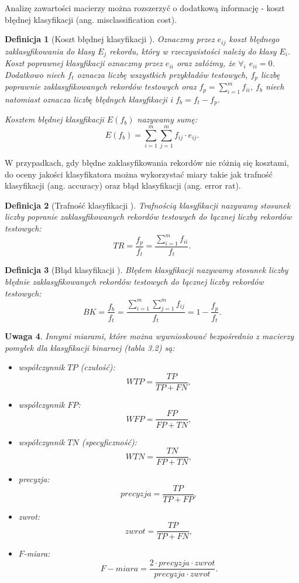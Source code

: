 \documentclass[12pt,a4paper]{report}
\newtheorem{df}{Definicja}[chapter]
\newtheorem{uwaga}[df]{Uwaga}
\begin{document}
Analizę zawartości macierzy można rozszerzyć o dodatkową informację - koszt błędnej klasyfikacji (ang. misclassification cost).
\begin{df}[Koszt błędnej klasyfikacji {\citep[Sec 4.8.1]{edmia}}]
Oznaczmy przez $e_{ij}$ koszt błędnego zaklasyfikowania do klasy $E_j$ rekordu, który w rzeczywistości należy do klasy $E_i$.
Koszt poprawnej klasyfikacji oznaczmy przez $e_{ii}$ oraz załóżmy, że $\forall_{i}$ $ e_{ii} = 0$.
Dodatkowo niech $f_{t}$ oznacza liczbę wszystkich przykładów testowych, $f_{p}$ liczbę poprawnie zaklasyfikowanych rekordów testowych oraz $f_{p} = \sum_{i=1}^m f_{ii}$, $f_{b}$ niech natomiast oznacza liczbę błędnych klasyfikacji i $f_{b} = f_{t} - f_{p}$.

Kosztem błędnej klasyfikacji $E(f_{b})$ nazywamy sumę:
$$
E(f_{b}) = \sum_{i=1}^m \sum_{j=1}^m f_{ij} \cdot e_{ij}.
$$
\end{df}

W przypadkach, gdy błędne zaklasyfikowania rekordów nie różnią się kosztami, do oceny jakości klasyfikatora można wykorzystać miary takie jak trafność klasyfikacji (ang. accuracy) oraz błąd klasyfikacji (ang. error rat).
\begin{df}[Trafność klasyfikacji {\citep[Sec 4.8.1]{edmia}}]
Trafnością klasyfikacji nazywamy stosunek liczby popranie zaklasyfikowanych rekordów testowych do łącznej liczby rekordów testowych:
$$
TR= \frac{f_p}{f_t} = \frac{\sum_{i=1}^m f_{ii}}{f_t}.
$$
\end{df}
\begin{df}[Błąd klasyfikacji {\citep[Sec 4.8.1]{edmia}}]
Błędem klasyfikacji nazywamy stosunek liczby błędnie zaklasyfikowanych rekordów testowych do łącznej liczby rekordów testowych:
$$
BK = \frac{f_b}{f_t}=\frac{\sum_{i=1}^m \sum_{j=1}^m f_{ij}}{f_t}=1 - \frac{f_p}{f_t}.
$$
\end{df}
\begin{uwaga}{\citep[Sec 4.8.1]{edmia}}
Innymi miarami, które można wywnioskować bezpośrednio z macierzy pomyłek dla klasyfikacji binarnej (tabla 3.2) są:
\begin{itemize}
\item współczynnik $TP$ (czułość):
$$
WTP = \frac{TP}{TP + FN},
$$
\item współczynnik $FP$:
$$
WFP = \frac{FP}{FP + TN},
$$
\item współczynnik $TN$ (specyficzność):
$$
WTN = \frac{TN}{FP + TN},
$$
\item precyzja:
$$
precyzja = \frac{TP}{TP + FP},
$$
\item zwrot:
$$
zwrot = \frac{TP}{TP + FN},
$$
\item $F$-miara:
$$
F - miara = \frac{2 \cdot precyzja \cdot zwrot}{precyzja \cdot zwrot}.
$$
\end{itemize}
\end{uwaga}
\end{document}
